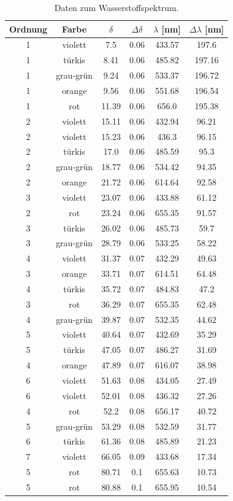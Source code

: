 \documentclass[]{article}
\begin{document}
\begin{table}[h]
\centering
\begin{tabular}{|c|c|c|c|c|c|}
\hline
Ordnung & Farbe & $\delta$ & $\Delta\delta$ & $\lambda$ [nm] & $\Delta\lambda$ [nm] \\ \hline\hline
1 & violett & 7.5 & 0.06 & 433.57 & 197.6 \\ \hline
1 & türkis & 8.41 & 0.06 & 485.82 & 197.16 \\ \hline
1 & grau-grün & 9.24 & 0.06 & 533.37 & 196.72 \\ \hline
1 & orange & 9.56 & 0.06 & 551.68 & 196.54 \\ \hline
1 & rot & 11.39 & 0.06 & 656.0 & 195.38 \\ \hline
2 & violett & 15.11 & 0.06 & 432.94 & 96.21 \\ \hline
2 & violett & 15.23 & 0.06 & 436.3 & 96.15 \\ \hline
2 & türkis & 17.0 & 0.06 & 485.59 & 95.3 \\ \hline
2 & grau-grün & 18.77 & 0.06 & 534.42 & 94.35 \\ \hline
2 & orange & 21.72 & 0.06 & 614.64 & 92.58 \\ \hline
3 & violett & 23.07 & 0.06 & 433.88 & 61.12 \\ \hline
2 & rot & 23.24 & 0.06 & 655.35 & 91.57 \\ \hline
3 & türkis & 26.02 & 0.06 & 485.73 & 59.7 \\ \hline
3 & grau-grün & 28.79 & 0.06 & 533.25 & 58.22 \\ \hline
4 & violett & 31.37 & 0.07 & 432.29 & 49.63 \\ \hline
3 & orange & 33.71 & 0.07 & 614.51 & 64.48 \\ \hline
4 & türkis & 35.72 & 0.07 & 484.83 & 47.2 \\ \hline
3 & rot & 36.29 & 0.07 & 655.35 & 62.48 \\ \hline
4 & grau-grün & 39.87 & 0.07 & 532.35 & 44.62 \\ \hline
5 & violett & 40.64 & 0.07 & 432.69 & 35.29 \\ \hline
5 & türkis & 47.05 & 0.07 & 486.27 & 31.69 \\ \hline
4 & orange & 47.89 & 0.07 & 616.07 & 38.98 \\ \hline
6 & violett & 51.63 & 0.08 & 434.05 & 27.49 \\ \hline
6 & violett & 52.01 & 0.08 & 436.32 & 27.26 \\ \hline
4 & rot & 52.2 & 0.08 & 656.17 & 40.72 \\ \hline
5 & grau-grün & 53.29 & 0.08 & 532.59 & 31.77 \\ \hline
6 & türkis & 61.36 & 0.08 & 485.89 & 21.23 \\ \hline
7 & violett & 66.05 & 0.09 & 433.68 & 17.34 \\ \hline
5 & rot & 80.71 & 0.1 & 655.63 & 10.73 \\ \hline
5 & rot & 80.88 & 0.1 & 655.95 & 10.54 \\ \hline
\hline
\end{tabular}
\caption{Daten zum Wasserstoffspektrum.\label{H Data}}
\end{table}
\end{document}
